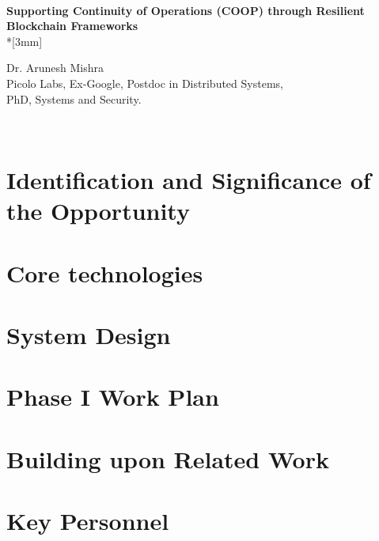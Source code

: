 \documentclass{proposal}
\begin{document}
\hfill \break
\\
\begin{center}
{\Large \bf Supporting Continuity of Operations (COOP) through Resilient Blockchain Frameworks } \\*[3mm]

Dr. Arunesh Mishra\\
Picolo Labs, Ex-Google, Postdoc in Distributed Systems,\\ PhD, Systems and Security.

\end{center}
\hfill \break
\\
\section{Identification and Significance of the Opportunity}


\section{Core technologies}


\section{System Design}

\section{Phase I Work Plan}

\section{Building upon Related Work}


\section{Key Personnel}



\newpage
{}
\renewcommand{\thepage} {E--\arabic{page}}




%
\end{document}
